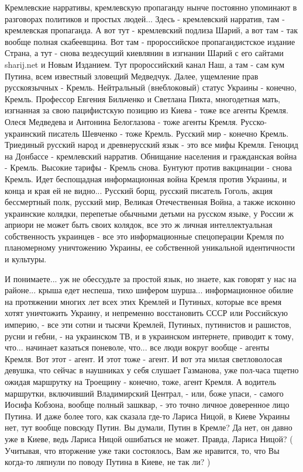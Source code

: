 Кремлевские нарративы, кремлевскую пропаганду нынче постоянно упоминают в
разговорах политиков и простых людей... Здесь - кремлевский нарратив, там -
кремлевская пропаганда.  А вот тут - кремлевский подлиза Шарий, а вот там - так
вообще полная скабеевщина. Вот там - пророссийское пропагандистское издание
Страна, а тут - снова вездесущий киевлянин в изгнании Шарий с его сайтами
sharij.net и Новым Изданием. Тут пророссийский канал Наш, а там - сам кум
Путина, всем известный зловещий Медведчук. Далее, ущемление прав русскоязычных
- Кремль. Нейтральный (внеблоковый) статус Украины - конечно, Кремль. Профессор
Евгения Бильченко и Светлана Пикта, многодетная мать, изгнанная за свою
пацифистскую позицию из Киева - тоже все агенты Кремля. Олеся Медведева и
Антонина Белоглазова - тоже агенты Кремля. Русско-украинский писатель Шевченко
- тоже Кремль. Русский мир - конечно Кремль. Триединый русский народ и
древнерусский язык - это все мифы Кремля. Геноцид на Донбассе - кремлевский
нарратив.  Обнищание населения и гражданская война - Кремль. Высокие тарифы -
Кремль снова. Бунтуют против вакцинации - снова Кремль. Идет беспощадная
информационная война Кремля против Украины, и конца и края ей не видно...
Русский борщ, русский писатель Гоголь, акция бессмертный полк, русский мир,
Великая Отечественная Война, а также исконно украинские колядки, перепетые
обычными детьми на русском языке, у России ж априори не может быть своих
колядок, все это ж личная интеллектуальная собственность украинцев - все это
информационные спецоперации Кремля по планомерному уничтожению Украины, ее
собственной уникальной идентичности и культуры.

И понимаете... уж не обессудьте за простой язык, но знаете, как говорят у нас
на районе...  крыша едет неспеша, тихо шифером шурша... информационное обилие
на протяжении многих лет всех этих Кремлей и Путиных, которые все время хотят
уничтожить Украину, и непременно восстановить СССР или Российскую империю, -
все эти сотни и тысячи Кремлей, Путиных, путинистов и рашистов, русни и гебни,
- на украинском ТВ, и в украинском интернете, приводит к тому, что... начинает
казаться поневоле, что... все люди вокруг вообще - агенты Кремля. Вот этот -
агент. И этот тоже - агент. И вот эта милая светловолосая девушка, что сейчас в
наушниках у себя слушает Газманова, уже пол-часа тщетно ожидая маршрутку на
Троещину - конечно, тоже, агент Кремля. А водитель маршрутки, включивший
Владимирский Централ, - или, боже упаси, - самого Иосифа Кобзона, вообще полный
зашквар, - это точно личное доверенное лицо Путина. И даже более того, как
сказала где-то Лариса Ницой, в Киеве Украины нет, тут вообще повсюду Путин. Вы
думали, Путин в Кремле? Да нет, он давно уже в Киеве, ведь Лариса Ницой
ошибаться не может.  Правда, Лариса Ницой? ( Учитывая, что вторжение уже таки
состоялось, Вам же нравится, то, что Вы когда-то ляпнули по поводу Путина в
Киеве, не так ли? )

